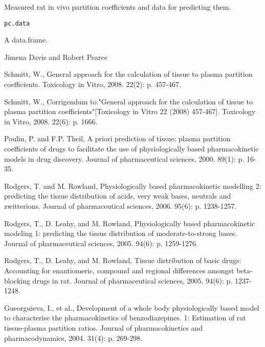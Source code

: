 \documentclass[a4paper]{book}
\begin{document}
%
\begin{Description}\relax
Measured rat in vivo partition coefficients and data for predicting them.
\end{Description}
%
\begin{Usage}
\begin{verbatim}
pc.data
\end{verbatim}
\end{Usage}
%
\begin{Format}
A data.frame.
\end{Format}
%
\begin{Author}\relax
Jimena Davis and Robert Pearce
\end{Author}
%
\begin{References}\relax
Schmitt, W., General approach for the calculation of tissue to
plasma partition coefficients. Toxicology in Vitro, 2008. 22(2): p. 457-467.

Schmitt, W., Corrigendum to:"General approach for the calculation of tissue
to plasma partition coefficients"[Toxicology in Vitro 22 (2008) 457-467].
Toxicology in Vitro, 2008. 22(6): p. 1666.

Poulin, P. and F.P. Theil, A priori prediction of tissue: plasma partition
coefficients of drugs to facilitate the use of physiologically based
pharmacokinetic models in drug discovery. Journal of pharmaceutical
sciences, 2000. 89(1): p. 16-35.

Rodgers, T. and M. Rowland, Physiologically based pharmacokinetic modelling
2: predicting the tissue distribution of acids, very weak bases, neutrals
and zwitterions. Journal of pharmaceutical sciences, 2006. 95(6): p.
1238-1257.

Rodgers, T., D. Leahy, and M. Rowland, Physiologically based pharmacokinetic
modeling 1: predicting the tissue distribution of moderate-to-strong bases.
Journal of pharmaceutical sciences, 2005. 94(6): p. 1259-1276.

Rodgers, T., D. Leahy, and M. Rowland, Tissue distribution of basic drugs:
Accounting for enantiomeric, compound and regional differences amongst
beta-blocking drugs in rat. Journal of pharmaceutical sciences, 2005. 94(6):
p. 1237-1248.

Gueorguieva, I., et al., Development of a whole body physiologically based
model to characterise the pharmacokinetics of benzodiazepines. 1: Estimation
of rat tissue-plasma partition ratios. Journal of pharmacokinetics and
pharmacodynamics, 2004. 31(4): p. 269-298.


\end{References}
\end{document}
